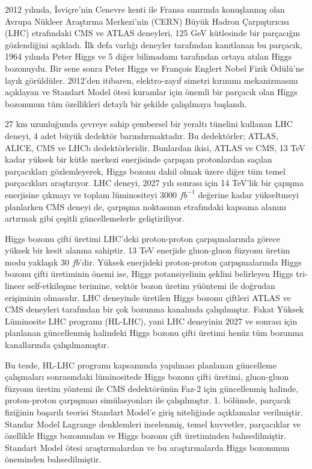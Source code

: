 2012 yılında, İsviçre’nin  Cenevre  kenti  ile  Fransa  sınırında  konuşlanmış olan Avrupa Nükleer Araştırma Merkezi’nin (CERN) Büyük Hadron Çarpıştırıcısı (LHC) etrafındaki CMS  ve  ATLAS  deneyleri, 125 GeV kütlesinde bir parçacığın gözlendiğini açıkladı. İlk defa varlığı deneyler tarafından kanıtlanan bu parçacık, 1964 yılında Peter Higgs ve 5 diğer bilimadamı tarafından ortaya atılan Higgs bozonuydu. Bir sene sonra Peter Higgs ve François Englert Nobel Fizik Ödülü'ne layık görüldüler. 2012'den itibaren, elektro-zayıf simetri kırınımı mekanizmasını açıklayan ve Standart Model ötesi kuramlar için önemli bir parçacık olan Higgs bozonunun tüm özellikleri detaylı bir şekilde çalışılmaya başlandı.

27 km uzunluğunda çevreye sahip çembersel bir yeraltı tünelini kullanan LHC deneyi, 4 adet büyük dedektör barındırmaktadır. Bu dedektörler; ATLAS, ALICE, CMS ve LHCb dedektörleridir. Bunlardan ikisi, ATLAS ve CMS, 13 TeV kadar yüksek bir kütle merkezi enerjisinde çarpışan protonlardan saçılan parçacıkları gözlemleyerek, Higgs bozonu dahil olmak üzere diğer tüm temel parçacıkları araştırıyor. LHC deneyi, 2027 yılı sonrası için 14 TeV'lik bir çapışma enerjisine çıkmayı ve toplam lüminositeyi 3000 $fb^{-1}$ değerine kadar yükseltmeyi planlarken CMS deneyi de, çarpışma noktasının etrafındaki kapsama alanını artırmak gibi çeşitli güncellemelerle geliştiriliyor.

Higgs bozonu çifti üretimi LHC'deki proton-proton çarpışmalarında görece yüksek bir kesit alanına sahiptir. 13 TeV enerjide gluon-gluon füzyonu üretim modu yaklaşık 30 $fb$'dir. Yüksek enerjideki proton-proton çarpışmalarında Higgs bozonu çifti üretiminin önemi ise, Higgs potansiyelinin şeklini belirleyen Higgs tri-lineer self-etkileşme terimine, vektör bozon üretim yüöntemi ile doğrudan erişiminin olmasıdır. LHC deneyinde üretilen Higgs bozonu çiftleri ATLAS ve CMS deneyleri tarafından bir çok bozunma kanalında çalışılmıştır. Fakat Yüksek Lüminosite LHC programı (HL-LHC), yani LHC deneyinin 2027 ve sonrası için planlanan güncellenmiş halindeki Higgs bozonu çifti üretimi henüz tüm bozunma kanallarında çalışılmamıştır.

Bu tezde, HL-LHC programı kapsamında yapılması planlanan güncelleme çalışmaları sonrasındaki lüminositede Higgs bozonu çifti üretimi, gluon-gluon füzyonu üretim yöntemi ile CMS dedektörünün Faz-2 için güncellenmiş halinde, proton-proton çarpışması simülasyonları ile çalışılmıştır. 1. bölümde, parçacık fiziğinin başarılı teorisi Standart Model'e giriş niteliğinde açıklamalar verilmiştir. Standar Model Lagrange denklemleri incelenmiş, temel kuvvetler, parçacıklar ve özellikle Higgs bozonundan ve Higgs bozonu çift üretiminden bahsedilmiştir. Standart Model ötesi araştırmalardan ve bu araştırmalarda Higgs bozonunun öneminden bahsedilmiştir.

